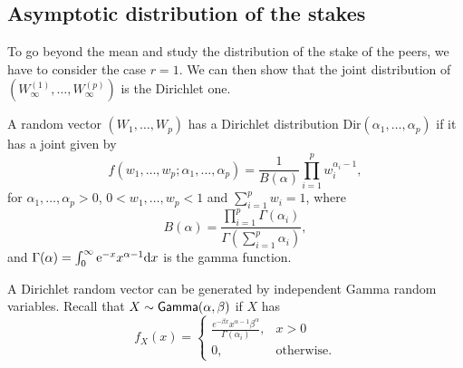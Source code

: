 \subsection{Asymptotic distribution of the stakes}\label{ssec:stakes_distribution}
To go beyond the mean and study the distribution of the stake of the peers, we have to consider the case $r = 1$. We can then show that the joint distribution of $(W_\infty^{(1)},\ldots,  W_\infty^{(p)})$ is the Dirichlet one. 
\begin{definition}\label{def:dirichlet}
A random vector $(W_1,\ldots, W_p)$ has a Dirichlet distribution $\text{Dir}(\alpha_1,\ldots, \alpha_p)$ if it has a joint \pdf given by 
\begin{equation}\label{eq:dirichlet_pdf}
f(w_1,\ldots, w_p;\alpha_1,\ldots, \alpha_p) = \frac{1}{B(\alpha)}\prod_{i=1}^p w_i^{\alpha_i-1}, 
\end{equation}
for $\alpha_1,\ldots, \alpha_p>0$, $0< w_1,\ldots, w_p <1$ and $\sum_{i=1}^pw_i=1$, where 
$$
B(\alpha) = \frac{\prod_{i = 1}^p \Gamma(\alpha_i)}{\Gamma(\sum_{i=1}^p \alpha_i)},
$$
and $\Gamma(\alpha) = \int_{0}^{\infty}\mathrm{e}^{-x}x^{\alpha-1}\text{d}x$ is the gamma function.
\end{definition}
\noindent A Dirichlet random vector can be generated by independent Gamma random variables. Recall that $X\sim\mathsf{Gamma}(\alpha, \beta)$ if $X$ has \pdf
\begin{equation}\label{eq:gamma_pdf}
f_{X}(x) = \begin{cases}
\frac{e^{-\beta x}x^{\alpha-1}\beta^\alpha}{\Gamma(\alpha_i)},&
x>0\\
0,&\text{otherwise}.\end{cases}
\end{equation}

